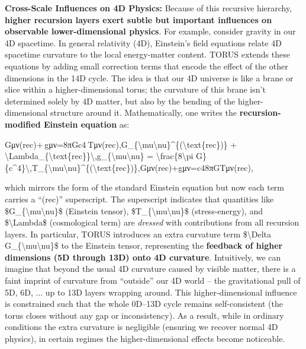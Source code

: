 \documentclass[
]{article}
\begin{document}
{\textbf{Cross-Scale Influences on 4D Physics:} Because of this recursive
hierarchy, \textbf{higher recursion layers exert subtle but important
influences on observable lower-dimensional physics}. For example,
consider gravity in our 4D spacetime. In general relativity (4D),
Einstein's field equations relate 4D spacetime curvature to the local
energy-matter content. TORUS extends these equations by adding small
correction terms that encode the effect of the other dimensions in the
14D cycle. The idea is that our 4D universe is like a brane or slice
within a higher-dimensional torus; the curvature of this brane isn't
determined solely by 4D matter, but also by the bending of the
higher-dimensional structure around it. Mathematically, one writes the
\textbf{recursion-modified Einstein equation} as:

Gμν(rec)+\Lambdarec gμν=8πGc4 Tμν(rec),G\_\{\textbackslash mu\textbackslash nu\}\^{}\{(\textbackslash text\{rec\})\}
+
\textbackslash Lambda\_\{\textbackslash text\{rec\}\}\textbackslash,g\_\{\textbackslash mu\textbackslash nu\}
= \textbackslash frac\{8\textbackslash pi
G\}\{c\^{}4\}\textbackslash,T\_\{\textbackslash mu\textbackslash nu\}\^{}\{(\textbackslash text\{rec\})\},Gμν(rec)\hspace{0pt}+\Lambdarec\hspace{0pt}gμν\hspace{0pt}=c48πG\hspace{0pt}Tμν(rec)\hspace{0pt},

which mirrors the form of the standard Einstein equation but now each
term carries a ``(rec)'' superscript\hspace{0pt}. The superscript
indicates that quantities like
\$G\_\{\textbackslash mu\textbackslash nu\}\$ (Einstein tensor),
\$T\_\{\textbackslash mu\textbackslash nu\}\$ (stress-energy), and
\$\textbackslash Lambda\$ (cosmological term) are \emph{dressed} with
contributions from all recursion layers\hspace{0pt}. In particular,
TORUS introduces an extra curvature term \$\textbackslash Delta
G\_\{\textbackslash mu\textbackslash nu\}\$ to the Einstein tensor,
representing the \textbf{feedback of higher dimensions (5D through 13D)
onto 4D curvature}\hspace{0pt}. Intuitively, we can imagine that beyond
the usual 4D curvature caused by visible matter, there is a faint
imprint of curvature from ``outside'' our 4D world -- the gravitational
pull of 5D, 6D, ... up to 13D layers wrapping around. This
higher-dimensional influence is constrained such that the whole 0D--13D
cycle remains self-consistent (the torus closes without any gap or
inconsistency). As a result, while in ordinary conditions the extra
curvature is negligible (ensuring we recover normal 4D physics), in
certain regimes the higher-dimensional effects become noticeable.

}
\end{document}
